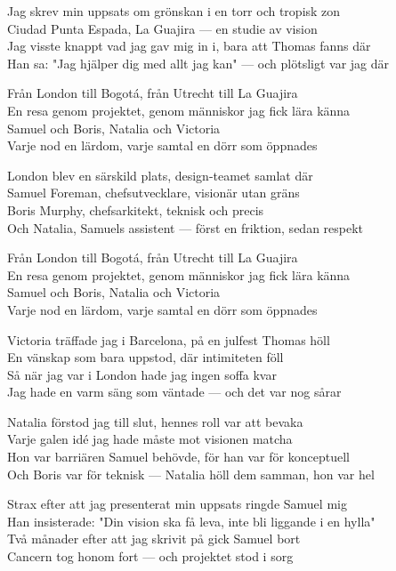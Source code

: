 \begin{lyrics}
Jag skrev min uppsats om grönskan i en torr och tropisk zon\\
Ciudad Punta Espada, La Guajira — en studie av vision\\
Jag visste knappt vad jag gav mig in i, bara att Thomas fanns där\\
Han sa: "Jag hjälper dig med allt jag kan" — och plötsligt var jag där

Från London till Bogotá, från Utrecht till La Guajira\\
En resa genom projektet, genom människor jag fick lära känna\\
Samuel och Boris, Natalia och Victoria\\
Varje nod en lärdom, varje samtal en dörr som öppnades

London blev en särskild plats, design-teamet samlat där\\
Samuel Foreman, chefsutvecklare, visionär utan gräns\\
Boris Murphy, chefsarkitekt, teknisk och precis\\
Och Natalia, Samuels assistent — först en friktion, sedan respekt

Från London till Bogotá, från Utrecht till La Guajira\\
En resa genom projektet, genom människor jag fick lära känna\\
Samuel och Boris, Natalia och Victoria\\
Varje nod en lärdom, varje samtal en dörr som öppnades

Victoria träffade jag i Barcelona, på en julfest Thomas höll\\
En vänskap som bara uppstod, där intimiteten föll\\
Så när jag var i London hade jag ingen soffa kvar\\
Jag hade en varm säng som väntade — och det var nog sårar

Natalia förstod jag till slut, hennes roll var att bevaka\\
Varje galen idé jag hade måste mot visionen matcha\\
Hon var barriären Samuel behövde, för han var för konceptuell\\
Och Boris var för teknisk — Natalia höll dem samman, hon var hel

Strax efter att jag presenterat min uppsats ringde Samuel mig\\
Han insisterade: "Din vision ska få leva, inte bli liggande i en hylla"\\
Två månader efter att jag skrivit på gick Samuel bort\\
Cancern tog honom fort — och projektet stod i sorg


\end{lyrics}
